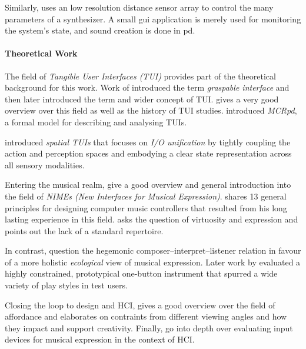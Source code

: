 \documentclass[10pt,a4paper]{scrartcl}
\begin{document}
Similarly, \cite{Miyama2010} uses an low resolution distance sensor array to control the many parameters of a synthesizer. A small gui application is merely used for monitoring the system's state, and sound creation is done in pd.


\paragraph{Theoretical Work}
The field of \emph{Tangible User Interfaces (TUI)} provides part of the theoretical background for this work. Work of \cite{Fitzmaurice1995} introduced the term \emph{graspable interface} and then later \cite{Ishii1997} introduced the term and wider concept of TUI. \cite{Shaer2009} gives a very good overview over this field as well as the history of TUI studies. \cite{Ullmer2000} introduced \emph{MCRpd}, a formal model for describing and analysing TUIs.

\cite{Sharlin2004} introduced \emph{spatial TUIs} that focuses on \emph{I/O unification} by tightly coupling the action and perception spaces and embodying a clear state representation across all sensory modalities.


Entering the musical realm, \cite{Fels2011} give a good overview and general introduction into the field of \emph{NIMEs (New Interfaces for Musical Expression)}. \cite{Cook2001} shares 13 general principles for designing computer music controllers that resulted from his long lasting experience in this field. \cite{Dobrian2006} asks the question of virtuosity and expression and points out the lack of a standard repertoire.

In contrast, \cite{Gurevich2007} question the hegemonic composer--interpret--listener relation in favour of a more holistic \emph{ecological} view of musical expression. Later work by \cite{Gurevich2010} evaluated a highly constrained, prototypical one-button instrument that spurred a wide variety of play styles in test users.

Closing the loop to design and HCI, \cite{Magnusson2010} gives a good overview over the field of affordance and elaborates on contraints from different viewing angles and how they impact and support creativity. Finally, \cite{Wanderley2002} go into depth over evaluating input devices for musical expression in the context of HCI. 






\end{document}
